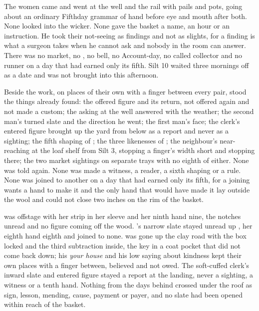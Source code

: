\scenebreak

The women came and went at the well and the rail with pails and pots, going about an ordinary Fifthday grammar of hand before eye and mouth after both. None looked into the wicker. None gave the basket a name, an hour or an instruction. He took their not-seeing as findings and not as slights, for a finding is what a surgeon takes when he cannot ask and nobody in the room can answer. There was no market, no , no bell, no Account-day, no called collector and no runner on a day that had earned only its fifth. Silt 10 waited three mornings off as a date and was not brought into this afternoon.

Beside the work, on places of their own with a finger between every pair, stood the things already found: the offered figure and its return, not offered again and not made a custom; the asking at the well answered with the weather; the second man's turned slate and the direction he went; the first man's face; the clerk's entered figure brought up the yard from  below  as a report and never as a sighting; the fifth shaping of ; the three likenesses of ; the neighbour's near-reaching at the loaf shelf from Silt 3, stopping a finger's width short and stopping there; the two market sightings on separate trays with no eighth of either. None was told again. None was made a witness, a reader, a sixth shaping or a rule. None was joined to another on a day that had earned only its fifth, for a joining wants a hand to make it and the only hand that would have made it lay outside the wool and could not close two inches on the rim of the basket.

 was offstage with her strip in her sleeve and her ninth hand nine, the notches unread and no figure coming off the wood. 's narrow slate stayed unread up , her eighth hand eighth and joined to none.  was gone up the clay road with the box locked and the third subtraction inside, the key in a coat pocket that did not come back down; his \emph{your house} and his low saying about kindness kept their own places with a finger between, believed and not owed. The soft-cuffed clerk's inward slate and entered figure stayed a report at the landing, never a sighting, a witness or a tenth hand. Nothing from the days behind crossed under the roof as sign, lesson, mending, cause, payment or payer, and no slate had been opened within reach of the basket.

